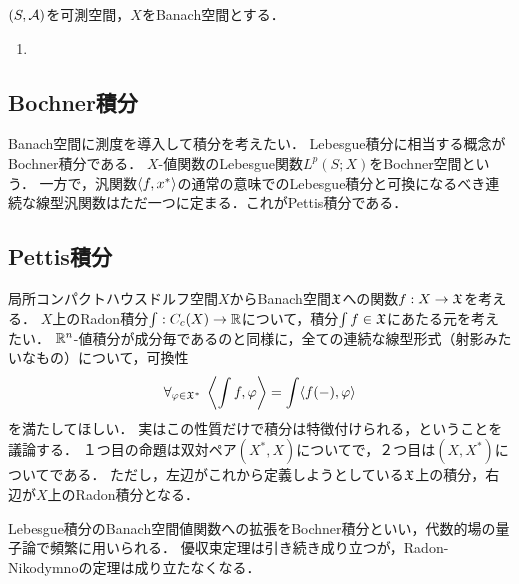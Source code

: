 \documentclass[uplatex,dvipdfmx]{jsreport}
\begin{document}
\begin{notation}
    $(S,\mathcal{A})$を可測空間，$X$をBanach空間とする．
\end{notation}

\begin{definition}\mbox{}
    \begin{enumerate}
        \item 
    \end{enumerate}
\end{definition}

\subsection{Bochner積分}

\begin{tcolorbox}[colframe=ForestGreen, colback=ForestGreen!10!white,breakable,colbacktitle=ForestGreen!40!white,coltitle=black,fonttitle=\bfseries\sffamily,
    title=]
    Banach空間に測度を導入して積分を考えたい．
    Lebesgue積分に相当する概念がBochner積分である．
    $X$-値関数のLebesgue関数$L^p(S;X)$をBochner空間という．
    一方で，汎関数$\langle f,x^*\rangle$の通常の意味でのLebesgue積分と可換になるべき連続な線型汎関数はただ一つに定まる．これがPettis積分である．
\end{tcolorbox}

\subsection{Pettis積分}\label{subsection-Pettis-integral}

\begin{tcolorbox}[colframe=ForestGreen, colback=ForestGreen!10!white,breakable,colbacktitle=ForestGreen!40!white,coltitle=black,fonttitle=\bfseries\sffamily,
title=Pettis積分]
    局所コンパクトハウスドルフ空間$X$からBanach空間$\mathfrak{X}$への関数$f:X\to\mathfrak{X}$を考える．
    $X$上のRadon積分$\int:C_c(X)\to\mathbb{R}$について，積分$\int f\in\mathfrak{X}$にあたる元を考えたい．
    $\mathbb{R}^n$-値積分が成分毎であるのと同様に，全ての連続な線型形式（射影みたいなもの）について，可換性
    \[\forall_{\varphi\in\mathfrak{X}^*}\;\left\langle\int f,\varphi\right\rangle=\int\langle f(-),\varphi\rangle\]
    を満たしてほしい．
    実はこの性質だけで積分は特徴付けられる，ということを議論する．
    １つ目の命題は双対ペア$(X^*,X)$についてで，２つ目は$(X,X^*)$についてである．
    ただし，左辺がこれから定義しようとしている$\mathfrak{X}$上の積分，右辺が$X$上のRadon積分となる．

    Lebesgue積分のBanach空間値関数への拡張をBochner積分といい，代数的場の量子論で頻繁に用いられる．
    優収束定理は引き続き成り立つが，Radon-Nikodymnoの定理は成り立たなくなる．
\end{tcolorbox}
\end{document}
